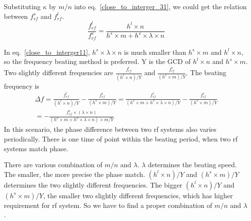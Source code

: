 Substituting $\kappa$ by $m/n$ into eq.~\ref{close_to_interger_31}, we could get the relation between $f_{\mathit{rf}}^{s}$ and $f_{\mathit{rf}}^{l}$.
\begin{equation} 
\frac{f_{\mathit{rf}}^{l}}{f_{\mathit{rf}}^{s}}=\frac{h^l\times n}{h^s \times m+ h^s \times\lambda\times n}\label{close_to_interger11}
\end{equation}

In eq.~\ref{close_to_interger11}, $h^s \times\lambda\times n$ is much smaller than $h^s \times m$ and $h^l\times n$, so the frequency beating method is preferred. Y is the GCD of $h^l\times n$ and $h^s \times m$. Two slightly different frequencies are $\frac{f_{\mathit{rf}}^{l}}{(h^l\times n)/Y}$ and $\frac{f_{\mathit{rf}}^{s}}{(h^s\times m)/Y}$. The beating frequency is
\begin{equation} 
\begin{split}
\Delta f=\frac{f_{\mathit{rf}}^{l}}{(h^l\times n)/Y} - \frac{f_{\mathit{rf}}^{s}}{(h^s\times m)/Y}=\frac{f_{\mathit{rf}}^{s}}{(h^s \times m+ h^s \times\lambda\times n)/Y} - \frac{f_{\mathit{rf}}^{s}}{(h^s\times m)/Y}\\=-\frac{f_{\mathit{rf}}^{s}\times(\lambda\times n)}{(h^s \times m+ h^s \times\lambda\times n) \times m/Y} 
\end{split}
\end{equation}
In this scenario, the phase difference between two rf systems also varies periodically. There is one time of point within the beating period, when two rf systems match phase. 

There are various combination of $m/n$ and $\lambda$. $\lambda$ determines the beating speed. The smaller, the more precise the phase match. $(h^l\times n)/Y$ and $(h^s\times m)/Y$ determines the two slightly different frequencies. The bigger $(h^l\times n)/Y$ and $(h^s\times m)/Y$, the smaller two slightly different frequencies, which has higher requirement for rf system. So we have to find a proper combination of $m/n$ and $\lambda$.



%

